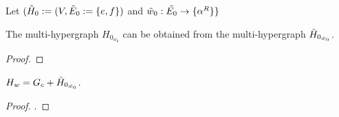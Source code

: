     Let $(\Tilde{H}_0 := (V, \Tilde{E}_0 :=\{e, f\})$ and $\Tilde{w}_0 : \Tilde{E_0} \rightarrow\{ \alpha^R\}\}$ 
    \begin{claim}
        The multi-hypergraph $H_{0_{w_0}}$ can be obtained from the multi-hypergraph $\Tilde{H}_{0_{\Tilde{w}_0}}$.
    \end{claim}
    \begin{proof}
    \end{proof}

    \begin{claim}
        $H_w = G_c + \Tilde{H}_{0_{\Tilde{w}_0}}$.
    \end{claim}
    \begin{proof}
        .
    \end{proof}

    

